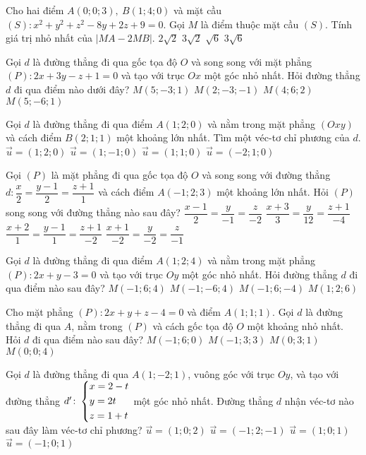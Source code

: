 \begin{ex}%
Cho hai điểm $A(0;0;3),~B(1;4;0)$ và mặt cầu $(S)\colon x^2+y^2+z^2-8y+2z+9=0$. Gọi $M$ là điểm thuộc mặt cầu $(S)$. Tính giá trị nhỏ nhất của $\left|MA-2MB\right|$.
\choice
{$2\sqrt{2}$}
{$3\sqrt{2}$}
{$\sqrt{6}$}
{$3\sqrt{6}$}
\end{ex}
\begin{ex}%
Gọi $d$ là đường thẳng đi qua gốc tọa độ $O$ và song song với mặt phẳng $(P)\colon2x+3y-z+1=0$ và tạo với trục $Ox$ một góc nhỏ nhất. Hỏi đường thẳng $d$ đi qua điểm nào dưới đây?
\choice
{$M(5;-3;1)$}
{$M(2;-3;-1)$}
{$M(4;6;2)$}
{$M(5;-6;1)$}
\end{ex}
\begin{ex}%
Gọi $d$ là đường thẳng đi qua điểm $A(1;2;0)$ và nằm trong mặt phẳng $(Oxy)$ và cách điểm $B(2;1;1)$ một khoảng lớn nhất. Tìm một véc-tơ chỉ phương của $d$.
\choice
{$\vec{u}=(1;2;0)$}
{$\vec{u}=(1;-1;0)$}
{$\vec{u}=(1;1;0)$}
{$\vec{u}=(-2;1;0)$}
\end{ex}
\begin{ex}%
Gọi $(P)$ là mặt phẳng đi qua gốc tọa độ $O$ và song song với đường thẳng $d\colon\dfrac{x}{2}=\dfrac{y-1}{2}=\dfrac{z+1}{1}$ và cách điểm $A(-1;2;3)$ một khoảng lớn nhất. Hỏi $(P)$ song song với đường thẳng nào sau đây?
\choice
{$\dfrac{x-1}{2}=\dfrac{y}{-1}=\dfrac{z}{-2}$}
{$\dfrac{x+3}{3}=\dfrac{y}{12}=\dfrac{z+1}{-4}$}
{$\dfrac{x+2}{1}=\dfrac{y-1}{1}=\dfrac{z+1}{-2}$}
{$\dfrac{x+1}{-2}=\dfrac{y}{-2}=\dfrac{z}{-1}$}
\end{ex}
\begin{ex}%
Gọi $d$ là đường thẳng đi qua điểm $A(1;2;4)$ và nằm trong mặt phẳng $(P)\colon2x+y-3=0$ và tạo với trục $Oy$ một góc nhỏ nhất. Hỏi đường thẳng $d$ đi qua điểm nào sau đây?
\choice
{$M(-1;6;4)$}
{$M(-1;-6;4)$}
{$M(-1;6;-4)$}
{$M(1;2;6)$}
\end{ex}
\begin{ex}%
Cho mặt phẳng $(P)\colon2x+y+z-4=0$ và điểm $A(1;1;1)$. Gọi $d$ là đường thẳng đi qua $A$, nằm trong $(P)$ và cách gốc tọa độ $O$ một khoảng nhỏ nhất. Hỏi $d$ đi qua điểm nào sau đây?
\choice
{$M(-1;6;0)$}
{$M(-1;3;3)$}
{$M(0;3;1)$}
{$M(0;0;4)$}
\end{ex}
\begin{ex}%
Gọi $d$ là đường thẳng đi qua $A(1;-2;1)$, vuông góc với trục $Oy$, và tạo với đường thẳng $d'\colon\left\{\begin{aligned}&x=2-t\\&y=2t\\&z=1+t\end{aligned}\right.$ một góc nhỏ nhất. Đường thẳng $d$ nhận véc-tơ nào sau đây làm véc-tơ chỉ phương?
\choice
{$\vec{u}=(1;0;2)$}
{$\vec{u}=(-1;2;-1)$}
{$\vec{u}=(1;0;1)$}
{$\vec{u}=(-1;0;1)$}
\end{ex}



